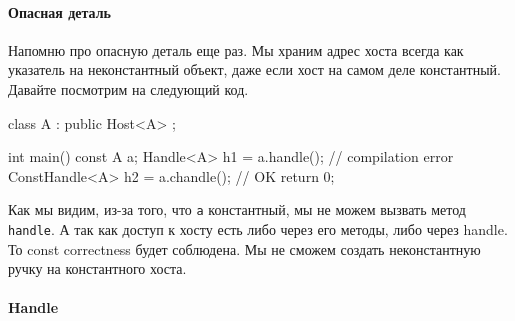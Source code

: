 \paragraph{Опасная деталь}

Напомню про опасную деталь еще раз.
Мы храним адрес хоста всегда как указатель на неконстантный объект, даже если хост на самом деле константный.
Давайте посмотрим на следующий код.
\begin{cppcode}
class A : public Host<A> {};

int main() {
  const A a;
  Handle<A> h1 = a.handle(); // compilation error
  ConstHandle<A> h2 = a.chandle(); // OK
  return 0;
}
\end{cppcode}
Как мы видим, из-за того, что \verb"a" константный, мы не можем вызвать метод \verb"handle".
А так как доступ к хосту есть либо через его методы, либо через handle.
То const correctness будет соблюдена.
Мы не сможем создать неконстантную ручку на константного хоста.

\paragraph{Handle}

